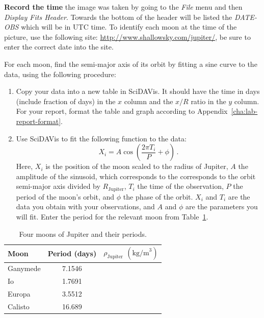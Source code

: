 \begin{steps}
	\item \textbf{Record the time} the image was taken by going to the \textit{File} menu and then \textit{Display Fits Header}. Towards the bottom of the header will be listed the \textit{DATE-OBS} which will be in UTC time. To identify each moon at the time of the picture, use the following site: \url{http://www.shallowsky.com/jupiter/}, be sure to enter the correct date into the site. 

	\item For each moon, find the semi-major axis of its orbit by fitting a sine curve to the data, using the following procedure:

	\begin{enumerate}
		\item Copy your data into a new table in SciDAVis. It should have the time in days (include fraction of days) in the $x$ column and the $x/R$ ratio in the $y$ column. For your report, format the table and graph according to Appendix~\ref{cha:lab-report-format}.
		
		\item Use SciDAVis to fit the following function to the data:
		\begin{equation}
		 X_i = A \cos \left( \frac{2\pi T_i}{P} + \phi \right)\,.
		\end{equation}
		Here, $X_i$ is the position of the moon scaled to the radius of Jupiter, $A$ the amplitude of the sinusoid, which corresponds to the corresponds to the orbit semi-major axis divided by $R_\textrm{Jupiter}$, $T_i$ the time of the observation, $P$ the period of the moon's orbit, and $\phi$ the phase of the orbit. $X_i$ and $T_i$ are the data you obtain with your observations, and $A$ and $\phi$ are the parameters you will fit. Enter the period for the relevant moon from Table~\ref{jd:tab:periods}.
	\end{enumerate}
\end{steps}

\begin{table}
	\centering
	\begin{tabular}{ l c r }
		\hline
		Moon & Period (days) & $\rho_\textrm{Jupiter}$ $(\textrm{kg/m}^3)$\\
		\hline
		Ganymede & 7.1546 & \\
		Io & 1.7691 & \\
		Europa & 3.5512 & \\
		Calisto & 16.689 & \\
		\hline  
	\end{tabular}
	\caption{Four moons of Jupiter and their periods.}\label{jd:tab:periods}
\end{table}

